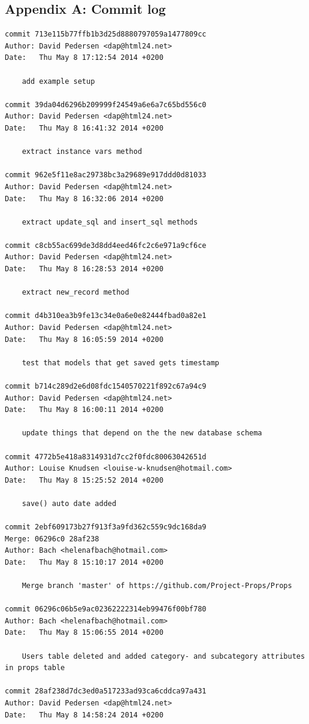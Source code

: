 \documentclass[12pt]{article}
\begin{document}
\subsection{Appendix A: Commit log}
\begin{verbatim}
commit 713e115b77ffb1b3d25d8880797059a1477809cc
Author: David Pedersen <dap@html24.net>
Date:   Thu May 8 17:12:54 2014 +0200

    add example setup

commit 39da04d6296b209999f24549a6e6a7c65bd556c0
Author: David Pedersen <dap@html24.net>
Date:   Thu May 8 16:41:32 2014 +0200

    extract instance vars method

commit 962e5f11e8ac29738bc3a29689e917ddd0d81033
Author: David Pedersen <dap@html24.net>
Date:   Thu May 8 16:32:06 2014 +0200

    extract update_sql and insert_sql methods

commit c8cb55ac699de3d8dd4eed46fc2c6e971a9cf6ce
Author: David Pedersen <dap@html24.net>
Date:   Thu May 8 16:28:53 2014 +0200

    extract new_record method

commit d4b310ea3b9fe13c34e0a6e0e82444fbad0a82e1
Author: David Pedersen <dap@html24.net>
Date:   Thu May 8 16:05:59 2014 +0200

    test that models that get saved gets timestamp

commit b714c289d2e6d08fdc1540570221f892c67a94c9
Author: David Pedersen <dap@html24.net>
Date:   Thu May 8 16:00:11 2014 +0200

    update things that depend on the the new database schema

commit 4772b5e418a8314931d7cc2f0fdc80063042651d
Author: Louise Knudsen <louise-w-knudsen@hotmail.com>
Date:   Thu May 8 15:25:52 2014 +0200

    save() auto date added

commit 2ebf609173b27f913f3a9fd362c559c9dc168da9
Merge: 06296c0 28af238
Author: Bach <helenafbach@hotmail.com>
Date:   Thu May 8 15:10:17 2014 +0200

    Merge branch 'master' of https://github.com/Project-Props/Props

commit 06296c06b5e9ac02362222314eb99476f00bf780
Author: Bach <helenafbach@hotmail.com>
Date:   Thu May 8 15:06:55 2014 +0200

    Users table deleted and added category- and subcategory attributes in props table

commit 28af238d7dc3ed0a517233ad93ca6cddca97a431
Author: David Pedersen <dap@html24.net>
Date:   Thu May 8 14:58:24 2014 +0200


\end{verbatim}
\end{document}
